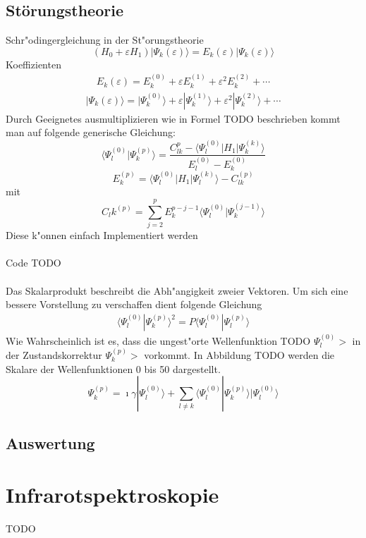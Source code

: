 \begin{refsection}
\subsection{Störungstheorie}
Schr"odingergleichung in der St"orungstheorie
\begin{equation}
(H_0+\varepsilon H_1)|\Psi_k(\varepsilon)\rangle
=
E_k(\varepsilon)|\Psi_k(\varepsilon)\rangle
\end{equation}
Koeffizienten
\begin{align*}
E_k(\varepsilon)
=
E_k^{(0)}+\varepsilon E_k^{(1)}+\varepsilon^2 E_k^{(2)}+\dotsb
\end{align*}
\begin{align*}
|\Psi_k(\varepsilon)\rangle
=
|\Psi_k^{(0)}\rangle+\varepsilon|\Psi_k^{(1)}\rangle+
\varepsilon^2|\Psi_k^{(2)}\rangle+\dotsb
\end{align*}
Durch Geeignetes ausmultiplizieren wie in Formel TODO beschrieben kommt man auf
folgende generische Gleichung:
\begin{equation}
\langle\Psi_l^{(0)}|\Psi_k^{(p)}\rangle
=
\frac{C_{lk}^{p}-\langle\Psi_l^{(0)}|H_1|\Psi_k^{(k)}\rangle}
{E_l^{(0)}-E_k^{(0)}}
\end{equation}
\begin{equation}
E_k^{(p)}
=
\langle\Psi_l^{(0)}|H_1|\Psi_l^{(k)}\rangle-C_{lk}^{(p)}
\end{equation}
mit
\begin{equation}
C_lk^{(p)}
=
\displaystyle\sum_{j=2}^{p} E_k^{p-j-1}
\langle\Psi_l^{(0)}|\Psi_k^{(j-1)}\rangle
\end{equation}
Diese k"onnen einfach Implementiert werden\\
\\
Code TODO\\
\\
Das Skalarprodukt beschreibt die Abh"angigkeit zweier Vektoren. Um sich eine 
bessere Vorstellung zu verschaffen dient folgende Gleichung
\begin{align*}
\langle\Psi_l^{(0)}|\Psi_k^{(p)}\rangle^2
=
P\langle\Psi_l^{(0)}|\Psi_l^{(p)}\rangle
\end{align*}
Wie Wahrscheinlich ist es, dass die ungest"orte Wellenfunktion
TODO $\Psi_l^{(0)}>$ in der Zustandskorrektur $\Psi_k^{(p)}>$ vorkommt.
In Abbildung TODO werden die Skalare der Wellenfunktionen 0 bis 50
dargestellt.
\begin{equation}
\Psi_k^{(p)}
=
\imath\gamma|\Psi_l^{(0)}\rangle+
\displaystyle\sum_{l\neq k} \langle\Psi_l^{(0)}|\Psi_k^{(p)}\rangle
|\Psi_l^{(0)}\rangle
\end{equation}

\subsection{Auswertung}

\section{Infrarotspektroskopie}
TODO

\printbibliography[heading=subbibliography]
\end{refsection}

